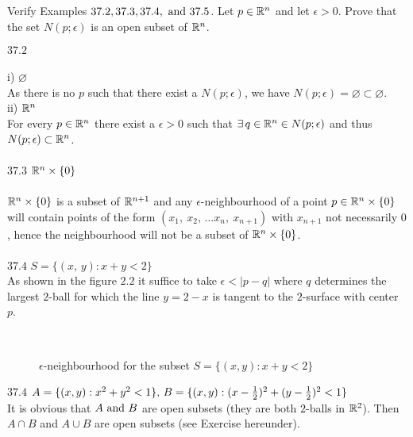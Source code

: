 \newpage


\renewcommand{\thesubsection}{\thesection.\arabic{subsection}}
\setcounter{subsection}{0}

\subsection{}
\begin{tcolorbox}
Verify Examples $37.2, 37.3, 37.4, \text{ and } 37.5$. Let $p \in \mathbb{R}^n$ and let $\epsilon > 0$. Prove that the set $N(p;\epsilon)$ is an open subset of $\mathbb{R}^n$.
\end{tcolorbox}
$\mathbf{37.2}$\\\\

i) $\varnothing$\\
As there is no $p$ such that there exist a $N(p;\epsilon)$, we have $N(p;\epsilon)=\varnothing\subset \varnothing$.\\
ii) $\mathbb{R}^n$\\
For every $p\in \mathbb{R}^n$ there exist a $\epsilon>0$ such that $\exists\, q\in\mathbb{R}^n\in N(p;\epsilon)$ and thus $N(p;\epsilon)\subset \mathbb{R}^n$.\\\\
$\mathbf{37.3}$ $\mathbb{R}^n\times \{0\}$\\\\
$\mathbb{R}^n\times \{0\}$ is a subset of $\mathbb{R}^{n+1}$ and any $\epsilon$-neighbourhood of a point $p\in \mathbb{R}^n\times \{0\}$ will contain points of the form $(x_1,\ x_2,\, \dots x_n,\ x_{n+1})$ with $x_{n+1}$ not necessarily $0$, hence the neighbourhood will not be a subset of $\mathbb{R}^n\times \{0\}$.\\\\
$\mathbf{37.4}$ $ S=\{(x,\, y): x+y<2\}$\\
As shown in the figure $2.2$ it suffice to take $\epsilon <|p-q|$ where $q$ determines the largest $2$-ball for which the line $y=2-x$ is tangent to the $2$-surface with center $p$.
\begin{figure}[H]%
    \centering
\\
\caption{$\epsilon$-neighbourhood for the subset $S=\{(x,y):x+y<2\}$  }
\label{fig:fig_p8a}
\end{figure}
$\mathbf{37.4}$ $ A=\{(x,y): x^2+y^2<1\},\, B=\{(x,y): (x-\frac{1}{2})^2+(y-\frac{1}{2})^2<1\}$\\
It is obvious that $A\text{ and } B$ are open subsets (they are both $2$-balls in $\mathbb{R}^2$). Then $A\cap B$ and $A\cup B$ are open subsets (see Exercise hereunder).\\

